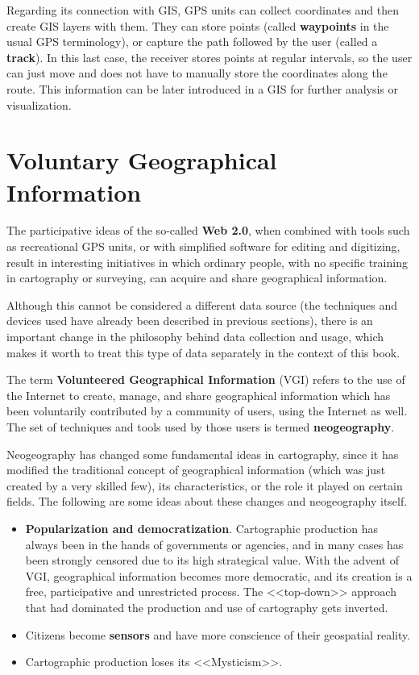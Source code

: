 Regarding its connection with GIS, GPS units can collect coordinates and then create GIS layers with them. They can store points (called \textbf{waypoints} in the usual GPS terminology), or capture the path followed by the user (called a \textbf{track}). In this last case, the receiver stores points at regular intervals, so the user can just move and does not have to manually store the coordinates along the route. This information can be later introduced in a GIS for further analysis or visualization. 


\section{Voluntary Geographical Information}

The participative ideas of the so-called \textbf{Web 2.0}, when combined with tools such as recreational GPS units, or with simplified software for editing and digitizing, result in interesting initiatives in which ordinary people, with no specific training in cartography or surveying, can acquire and share geographical information. 

Although this cannot be considered a different data source (the techniques and devices used have already been described in previous sections), there is an important change in the philosophy behind data collection and usage, which makes it worth to treat this type of data separately in the context of this book.

The term \textbf{Volunteered Geographical Information} (VGI) refers to the use of the Internet to create, manage, and share geographical information which has been voluntarily contributed by a community of users, using the Internet as well. The set of techniques and tools used by those users is termed \textbf{neogeography}. 

Neogeography has changed some fundamental ideas in cartography, since it has modified the traditional concept of geographical information (which was just created by a very skilled few), its characteristics, or the role it played on certain fields. The following are some ideas about these changes and neogeography itself.


\begin{itemize}
	\item \textbf{Popularization and democratization}. Cartographic production has always been in the hands of governments or agencies, and in many cases has been strongly censored due to its high strategical value. With the advent of VGI, geographical information becomes more democratic, and its creation is a free, participative and unrestricted process. The <<top-down>> approach that had dominated the production and use of cartography gets inverted.
	\item Citizens become \textbf{sensors} and have more conscience of their geospatial reality.
	\item Cartographic production loses its <<Mysticism>>.	
\end{itemize}

